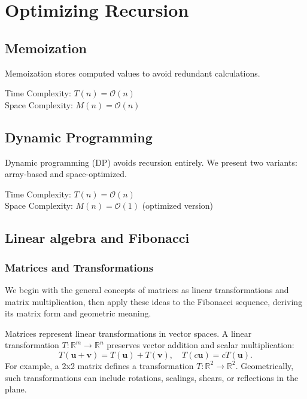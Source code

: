 \documentclass{article}
\begin{document}
\section{Optimizing Recursion}
\subsection{Memoization}
Memoization stores computed values to avoid redundant calculations.



Time Complexity: $T(n) = \mathcal{O}(n)$ \\
Space Complexity: $M(n) = \mathcal{O}(n)$


\subsection{Dynamic Programming}
Dynamic programming (DP) avoids recursion entirely. We present two variants: array-based and space-optimized.



Time Complexity: $T(n) = \mathcal{O}(n)$ \\
Space Complexity: $M(n) = \mathcal{O}(1)$ (optimized version)

\subsection{Linear algebra and Fibonacci}
\subsubsection{Matrices and Transformations}
We begin with the general concepts of matrices as linear transformations and matrix multiplication, then apply these ideas to the Fibonacci sequence, deriving its matrix form and geometric meaning.

Matrices represent linear transformations in vector spaces. A linear transformation \( T: \mathbb{R}^m \to \mathbb{R}^n \) preserves vector addition and scalar multiplication:
\[
T(\mathbf{u} + \mathbf{v}) = T(\mathbf{u}) + T(\mathbf{v}), \quad T(c \mathbf{u}) = c T(\mathbf{u}).
\]
For example, a 2x2 matrix defines a transformation \( T: \mathbb{R}^2 \to \mathbb{R}^2 \). Geometrically, such transformations can include rotations, scalings, shears, or reflections in the plane.
\end{document}
